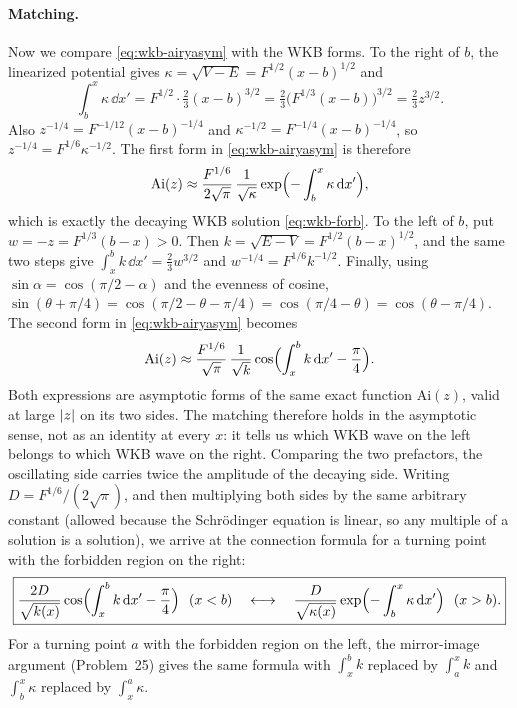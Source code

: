\paragraph{Matching.} Now we compare \cref{eq:wkb-airyasym} with the WKB forms. To the right of $b$, the linearized potential gives $\kappa=\sqrt{V-E}=F^{1/2}(x-b)^{1/2}$ and
\begin{equation}
\int_b^x\kappa\,\dd x'=F^{1/2}\cdot\tfrac23(x-b)^{3/2}=\tfrac23\bigl(F^{1/3}(x-b)\bigr)^{3/2}=\tfrac23z^{3/2}.
\end{equation}
Also $z^{-1/4}=F^{-1/12}(x-b)^{-1/4}$ and $\kappa^{-1/2}=F^{-1/4}(x-b)^{-1/4}$, so $z^{-1/4}=F^{1/6}\kappa^{-1/2}$. The first form in \cref{eq:wkb-airyasym} is therefore
\begin{equation}
\mathrm{Ai}(z)\approx\frac{F^{1/6}}{2\sqrt\pi}\,\frac{1}{\sqrt{\kappa}}\exp\Bigl(-\int_b^x\kappa\,\mathrm{d} x'\Bigr),
\end{equation}
which is exactly the decaying WKB solution \cref{eq:wkb-forb}. To the left of $b$, put $w=-z=F^{1/3}(b-x)>0$. Then $k=\sqrt{E-V}=F^{1/2}(b-x)^{1/2}$, and the same two steps give $\int_x^bk\,\dd x'=\tfrac23w^{3/2}$ and $w^{-1/4}=F^{1/6}k^{-1/2}$. Finally, using $\sin\alpha=\cos(\pi/2-\alpha)$ and the evenness of cosine, $\sin(\theta+\pi/4)=\cos(\pi/2-\theta-\pi/4)=\cos(\pi/4-\theta)=\cos(\theta-\pi/4)$. The second form in \cref{eq:wkb-airyasym} becomes
\begin{equation}
\mathrm{Ai}(z)\approx\frac{F^{1/6}}{\sqrt\pi}\,\frac{1}{\sqrt{k}}\cos\Bigl(\int_x^b k\,\mathrm{d} x'-\frac\pi4\Bigr).
\end{equation}
Both expressions are asymptotic forms of the same exact function $\mathrm{Ai}(z)$, valid at large $\left\lvert z\right\rvert$ on its two sides. The matching therefore holds in the asymptotic sense, not as an identity at every $x$: it tells us which WKB wave on the left belongs to which WKB wave on the right. Comparing the two prefactors, the oscillating side carries twice the amplitude of the decaying side. Writing $D=F^{1/6}/(2\sqrt\pi)$, and then multiplying both sides by the same arbitrary constant (allowed because the Schr\"odinger equation is linear, so any multiple of a solution is a solution), we arrive at the connection formula for a turning point with the forbidden region on the right:
\begin{equation}
\boxed{\frac{2D}{\sqrt{k(x)}}\cos\Bigl(\int_x^b k\,\dd x'-\frac\pi4\Bigr)\ \ (x<b)\quad\longleftrightarrow\quad
\frac{D}{\sqrt{\kappa(x)}}\exp\Bigl(-\int_b^x\kappa\,\dd x'\Bigr)\ \ (x>b).}
\label{eq:wkb-conn}
\end{equation}
For a turning point $a$ with the forbidden region on the left, the mirror-image argument (Problem~25) gives the same formula with $\int_x^b k$ replaced by $\int_a^xk$ and $\int_b^x\kappa$ replaced by $\int_x^a\kappa$.

